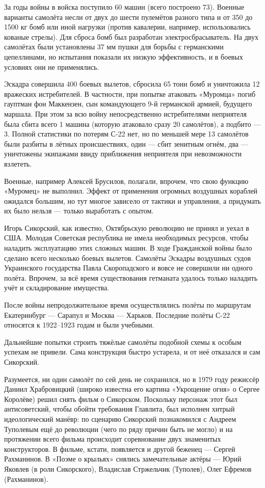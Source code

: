 За годы войны в войска поступило 60 машин (всего построено 73). Военные
варианты самолёта несли от двух до шести пулемётов разного типа и от 350 до
1500 кг бомб или иной нагрузки (против кавалерии, например, использовались
кованые стрелы). Для сброса бомб был разработан электросбрасыватель. На двух
самолётах были установлены 37 мм пушки для борьбы с германскими цепеллинами, но
испытания показали их низкую эффективность, и в боевых условиях они не
применялись.

Эскадра совершила 400 боевых вылетов, сбросила 65 тонн бомб и уничтожила 12
вражеских истребителей. В частности, при попытке атаковать «Муромца» погиб
гауптман фон Маккензен, сын командующего 9-й германской армией, будущего
маршала. При этом за всю войну непосредственно истребителями неприятеля была
сбита всего 1 машина (которую атаковало сразу 20 самолётов), а подбито — 3.
Полной статистики по потерям С-22 нет, но по меньшей мере 13 самолётов были
разбиты в лётных происшествиях, один — сбит зенитным огнём, два — уничтожены
экипажами ввиду приближения неприятеля при невозможности взлететь.

Военные, например Алексей Брусилов, полагали, впрочем, что свою функцию
«Муромец» не выполнил. Эффект от применения огромных воздушных кораблей
ожидался большим, но тут многое зависело от тактики и управления, а придумать
их было нельзя — только выработать с опытом.

Игорь Сикорский, как известно, Октябрьскую революцию не принял и уехал в США.
Молодая Советская республика не имела необходимых ресурсов, чтобы наладить
эксплуатацию этих сложных машин. В ходе Гражданской войны было сделано всего
несколько боевых вылетов. Самолёты Эскадры воздушных судов Украинского
государства Павла Скоропадского и вовсе не совершили ни одного полёта. Впрочем,
за всё время существования гетманата удалось только наладить учёт и
складирование имущества.

После войны непродолжительное время осуществлялись полёты по маршрутам
Екатеринбург — Сарапул и Москва — Харьков. Последние полёты С-22 относятся к
1922–1923 годам и были учебными.

Дальнейшие попытки строить тяжёлые самолёты подобной схемы к особым успехам не
привели. Сама конструкция быстро устарела, и от неё отказался и сам Сикорский.

Разумеется, ни один самолёт по сей день не сохранился, но в 1979 году режиссёр
Даниил Храбровицкий (широко известна его картина «Укрощение огня» о Сергее
Королёве) решил снять фильм о Сикорском. Поскольку персонаж этот был
антисоветский, чтобы обойти требования Главлита, был исполнен хитрый
идеологический манёвр: по сценарию Сикорский познакомился с Андреем Туполевым
ещё до революции (чего по ряду причин быть не могло) и на протяжении всего
фильма происходит соревнование двух знаменитых конструкторов. В фильме, кстати,
появляется и другой беженец — Сергей Рахманинов. В «Поэме о крыльях» снялись
замечательные актёры — Юрий Яковлев (в роли Сикорского), Владислав Стржельчик
(Туполев), Олег Ефремов (Рахманинов).

